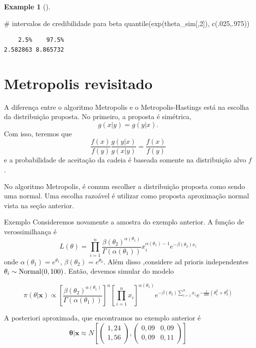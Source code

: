 \documentclass[
  letterpaper,
  DIV=11,
  numbers=noendperiod]{scrreprt}
\newenvironment{Shaded}{\begin{snugshade}}{\end{snugshade}}
\newcommand{\CommentTok}[1]{\textcolor[rgb]{0.37,0.37,0.37}{#1}}
\newcommand{\DecValTok}[1]{\textcolor[rgb]{0.68,0.00,0.00}{#1}}
\newcommand{\FunctionTok}[1]{\textcolor[rgb]{0.28,0.35,0.67}{#1}}
\newcommand{\NormalTok}[1]{\textcolor[rgb]{0.00,0.23,0.31}{#1}}
\theoremstyle{definition}
\theoremstyle{plain}
\theoremstyle{definition}
\newtheorem{example}{Example}[chapter]
\theoremstyle{remark}
\begin{document}
\begin{example}[]
\begin{Shaded}
\begin{Highlighting}[]
\CommentTok{\# intervalos de credibilidade para beta}
\FunctionTok{quantile}\NormalTok{(}\FunctionTok{exp}\NormalTok{(theta\_sim[,}\DecValTok{2}\NormalTok{]), }\FunctionTok{c}\NormalTok{(.}\DecValTok{025}\NormalTok{,.}\DecValTok{975}\NormalTok{))}
\end{Highlighting}
\end{Shaded}

\begin{verbatim}
    2.5%    97.5% 
2.582863 8.865732 
\end{verbatim}

\section{Metropolis revisitado}\label{metropolis-revisitado}

A diferença entre o algoritmo Metropolis e o Metropolis-Hastings está na
escolha da distribuição proposta. No primeiro, a proposta é simétrica,
\[g(x|y)=g(y|x).\] Com isso, teremos que
\[\frac{f(x)}{f(y)}\frac{g(y|x)}{g(x|y)}=\frac{f(x)}{f(y)}\] e a
probabilidade de aceitação da cadeia é baseada somente na distribuição
alvo \(f\).

No algoritmo Metropolis, é comum escolher a distribuição proposta como
sendo uma normal. Uma escolha razoável é utilizar como proposta
aproximação normal vista na seção anterior.

Exemplo Consideremos novamente a amostra do exemplo anterior. A função
de verossimilhança é
\[L(\theta)=\prod_{i=1}^n \frac{\beta(\theta_2)^{\alpha(\theta_1)}}{\Gamma(\alpha(\theta_1))} x_i^{\alpha(\theta_1)-1}e^{-\beta(\theta_2)x_i}\]
onde \(\alpha(\theta_1)=e^{\theta_1}\),
\(\beta(\theta_2)=e^{\theta_2}\). Além disso ,considere ad prioris
independentes \(\theta_i\sim\hbox{Normal}(0,100)\). Então, devemos
simular do modelo

\[\pi(\theta|\boldsymbol{x})\propto \left[\frac{\beta(\theta_2)^{\alpha(\theta_1)}}{\Gamma(\alpha(\theta_1))}\right]^n \left[\prod_{i=1}^n x_i\right]^{\alpha(\theta_1)}e^{-\beta(\theta_2)\sum_{i=1}^{n}x_i}e^{-\frac{1}{200}(\theta_1^2 + \theta_2^2)}\]

A posteriori aproximada, que encontramos no exemplo anterior é
\[\boldsymbol{\theta}|\boldsymbol{x}\approx N \left[ \left(\begin{array}{c}1,24\\1,56 \end{array}\right),\left(\begin{array}{cc}0,09 & 0,09\\0,09 &0,11\end{array}\right)\right]\]


\end{example}
\end{document}
